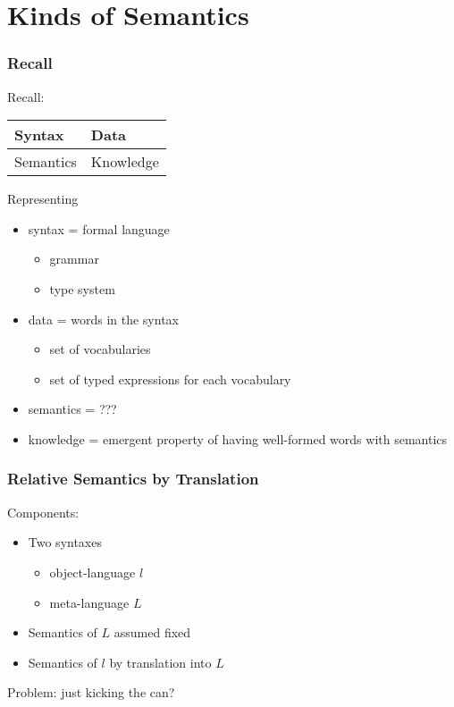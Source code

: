 \section{Kinds of Semantics}

\begin{frame}\frametitle{Recall}
Recall:

\begin{center}
\begin{tabular}{l|l}
Syntax & Data \\
\hline
Semantics & Knowledge
\end{tabular}
\end{center}

Representing
\begin{itemize}
\item syntax = formal language
\begin{itemize}
\item grammar  
\item type system 
\end{itemize}
\item data = words in the syntax
\begin{itemize}
\item set of vocabularies
\item set of typed expressions for each vocabulary
\end{itemize}
\item semantics = \alert{???}
\item knowledge = emergent property of having well-formed words with semantics
\end{itemize}
\end{frame}

\begin{frame}\frametitle{Relative Semantics by Translation}
Components:
\begin{itemize}
\item Two syntaxes
\begin{itemize}
\item object-language $l$ 
\item meta-language $L$ 
\end{itemize}
\item Semantics of $L$ assumed fixed
\item Semantics of $l$ by translation into $L$
\end{itemize}

Problem: just kicking the can?
\end{frame}

